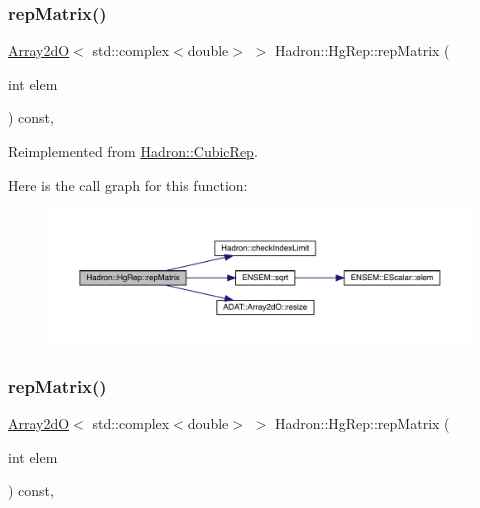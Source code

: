 \subsubsection{\texorpdfstring{repMatrix()}{repMatrix()}\hspace{0.1cm}{\footnotesize\ttfamily [1/3]}}
{\footnotesize\ttfamily \mbox{\hyperlink{classADAT_1_1Array2dO}{Array2dO}}$<$ std\+::complex$<$double$>$ $>$ Hadron\+::\+Hg\+Rep\+::rep\+Matrix (\begin{DoxyParamCaption}\item[{int}]{elem }\end{DoxyParamCaption}) const\hspace{0.3cm}{\ttfamily [inline]}, {\ttfamily [virtual]}}



Reimplemented from \mbox{\hyperlink{structHadron_1_1CubicRep_ac5d7e9e6f4ab1158b5fce3e4ad9e8005}{Hadron\+::\+Cubic\+Rep}}.

Here is the call graph for this function\+:
\nopagebreak
\begin{figure}[H]
\begin{center}
\leavevmode
\includegraphics[width=350pt]{d5/d3a/structHadron_1_1HgRep_a1ca0a9c28a8e0a9aba561029b7e61f08_cgraph}
\end{center}
\end{figure}
\mbox{\label{structHadron_1_1HgRep_a1ca0a9c28a8e0a9aba561029b7e61f08}} 
\subsubsection{\texorpdfstring{repMatrix()}{repMatrix()}\hspace{0.1cm}{\footnotesize\ttfamily [2/3]}}
{\footnotesize\ttfamily \mbox{\hyperlink{classADAT_1_1Array2dO}{Array2dO}}$<$ std\+::complex$<$double$>$ $>$ Hadron\+::\+Hg\+Rep\+::rep\+Matrix (\begin{DoxyParamCaption}\item[{int}]{elem }\end{DoxyParamCaption}) const\hspace{0.3cm}{\ttfamily [inline]}, {\ttfamily [virtual]}}



